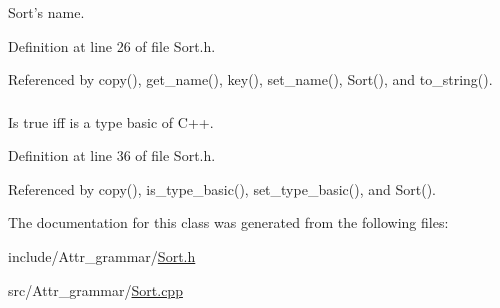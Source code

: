 Sort's name. 



Definition at line 26 of file Sort.h.



Referenced by copy(), get\_\-name(), key(), set\_\-name(), Sort(), and to\_\-string().

\hypertarget{classgenevalmag_1_1Sort_a063c9ca680a72b50a2018473d3be47c7}{
\subsubsection[{s\_\-type\_\-basic}]{}}
\label{classgenevalmag_1_1Sort_a063c9ca680a72b50a2018473d3be47c7}


Is true iff is a type basic of C++. 



Definition at line 36 of file Sort.h.



Referenced by copy(), is\_\-type\_\-basic(), set\_\-type\_\-basic(), and Sort().



The documentation for this class was generated from the following files:\begin{DoxyCompactItemize}
\item 
include/Attr\_\-grammar/\hyperlink{Sort_8h}{Sort.h}\item 
src/Attr\_\-grammar/\hyperlink{Sort_8cpp}{Sort.cpp}\end{DoxyCompactItemize}
